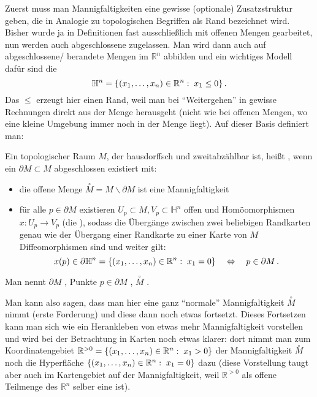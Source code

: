 \documentclass[../H_Analysis_main.tex]{subfiles}
\begin{document}
Zuerst muss man Mannigfaltigkeiten eine gewisse (optionale) Zusatzstruktur geben, die in Analogie zu topologischen Begriffen als Rand bezeichnet wird. Bisher wurde ja in Definitionen fast ausschließlich mit offenen Mengen gearbeitet, nun werden auch abgeschlossene zugelassen. Man wird dann auch auf abgeschlossene/ berandete Mengen im $\mathbb{R}^n$ abbilden und ein wichtiges Modell dafür sind die 
\begin{equation}
\mathbb{H}^n = \qty{(x_1, \dots, x_n) \in \mathbb{R}^n: \; x_1 \leq 0} \, .
\end{equation}
Das $\leq$ erzeugt hier einen Rand, weil man bei \enquote{Weitergehen} in gewisse Rechnungen direkt aus der Menge herausgeht (nicht wie bei offenen Mengen, wo eine kleine Umgebung immer noch in der Menge liegt). Auf dieser Basis definiert man:

\begin{defi}
Ein topologischer Raum $M$, der hausdorffsch und zweitabzählbar ist, heißt , wenn ein $\partial M \subset M$ abgeschlossen existiert mit:
\begin{itemize}
\item die offene Menge $\overset{\circ}{M} = M \backslash \partial M$ ist eine Mannigfaltigkeit

\item für alle $p \in \partial M$ existieren $U_p \subset M, V_p \subset \mathbb{H}^n$ offen und Homöomorphismen $x: U_p \rightarrow V_p$ (die ), sodass die Übergänge zwischen zwei beliebigen Randkarten genau wie der Übergang einer Randkarte zu einer Karte von $M$ Diffeomorphismen sind und weiter gilt:
\begin{equation}\label{eq:fordrand}
x(p) \in \partial\mathbb{H}^n = \qty{(x_1, \dots, x_n) \in \mathbb{R}^n: \; x_1 = 0} \quad \Leftrightarrow \quad p \in \partial M \, .
\end{equation}
\end{itemize}

Man nennt $\partial M$ , Punkte $p \in \partial M$ , $\overset{\circ}{M}$ .
\end{defi}

Man kann also sagen, dass man hier eine ganz \enquote{normale} Mannigfaltigkeit $\overset{\circ}{M}$ nimmt (erste Forderung) und diese dann noch etwas fortsetzt. Dieses Fortsetzen kann man sich wie ein Herankleben von etwas mehr Mannigfaltigkeit vorstellen und wird bei der Betrachtung in Karten noch etwas klarer: dort nimmt man zum Koordinatengebiet $\mathbb{R}^{ > 0} = \qty{(x_1, \dots, x_n) \in \mathbb{R}^n: \; x_1 > 0}$ der Mannigfaltigkeit $\overset{\circ}{M}$ noch die Hyperfläche $\qty{(x_1, \dots, x_n) \in \mathbb{R}^n: \; x_1 = 0}$ dazu (diese Vorstellung taugt aber auch im Kartengebiet auf der Mannigfaltigkeit, weil $\mathbb{R}^{ > 0}$ als offene Teilmenge des $\mathbb{R}^n$ selber eine ist).
\end{document}
